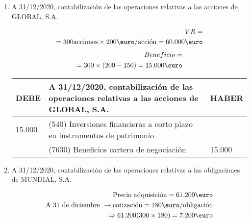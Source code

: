 \begin{enumerate}[label=\alph*)]
    \item A 31/12/2020, contabilización de las operaciones relativas a las acciones de GLOBAL, S.A.
    
    \begin{align*}
        VR = \\ 
        = 300 \text{acciones} \times 200 \text{\euro/acción} = 60.000 \text{\euro}
    \end{align*}
    \begin{align*}
        Beneficio =  \\ 
        = 300 \times (200-150) = \text{15.000} \text{\euro}
    \end{align*}

    \begin{table}[H]
        \centering
        \begin{tabular}{|p{3cm}|p{6cm}|p{3cm}|}
        \hline
        \rowcolor{blue!30}
        \textbf{DEBE} & \textbf{A 31/12/2020, contabilización de las operaciones relativas a las acciones de GLOBAL, S.A.} & \textbf{HABER} \\
        \hline
        15.000 & (540) Inversiones financieras a corto plazo en instrumentos de patrimonio & \\
        \hline
        & (7630) Beneficios cartera de negociación & 15.000 \\
        \hline
        \end{tabular}
    \end{table}

    \item A 31/12/2020, contabilización de las operaciones relativas a las obligaciones de MUNDIAL, S.A.
    
    \begin{align*}
        \text{Precio adquisición} = \text{61.200} \text{\euro} \\ \text{A 31 de diciembre } \rightarrow \text{cotización} = 180 \text{\euro/obligación} \\  \Rightarrow \text{61.200}  (300 \times 180) = 7.200 \text{\euro}
    \end{align*}


\end{enumerate}
